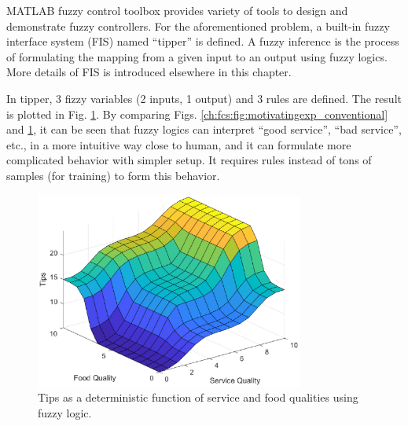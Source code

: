 MATLAB fuzzy control toolbox provides variety of tools to design and demonstrate fuzzy controllers. For the aforementioned problem, a built-in fuzzy interface system (FIS) named ``tipper'' is defined. A fuzzy inference is the process of formulating the mapping from a given input to an output using fuzzy logics. More details of FIS is introduced elsewhere in this chapter.

In tipper, 3 fizzy variables (2 inputs, 1 output) and 3 rules are defined. The result is plotted in Fig. \ref{ch:fcs:fig:motivatingexp_fis}. By comparing Figs. \ref{ch:fcs:fig:motivatingexp_conventional} and \ref{ch:fcs:fig:motivatingexp_fis}, it can be seen that fuzzy logics can interpret ``good service'', ``bad service'', etc., in a more intuitive way close to human, and it can formulate more complicated behavior with simpler setup. It requires rules instead of tons of samples (for training) to form this behavior.

\begin{figure}
	\centering
	\includegraphics[width=250pt]{chapters/ch-fuzzy-control-system/figures/motivatingexp_fis.eps}
	\caption{Tips as a deterministic function of service and food qualities using fuzzy logic.} \label{ch:fcs:fig:motivatingexp_fis}
\end{figure}











